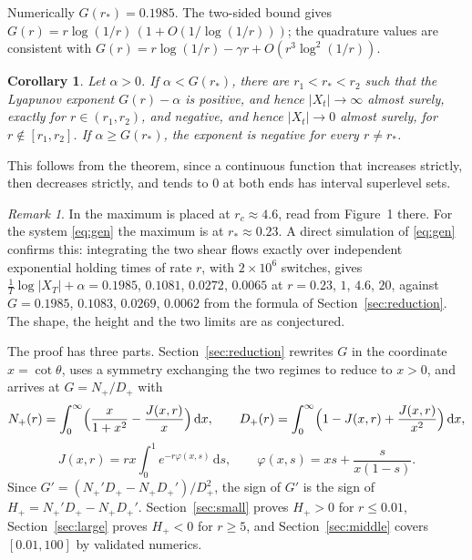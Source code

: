 \documentclass[11pt]{amsart}
\newtheorem{corollary}[theorem]{Corollary}
\theoremstyle{remark}
\newtheorem{remark}[theorem]{Remark}
\numberwithin{equation}{section}
\newcommand{\dd}{\,\mathrm{d}}
\begin{document}
Numerically $G(r_*)=0.1985$. The two-sided bound gives $G(r)=r\log(1/r)\,(1+O(1/\log(1/r)))$; the quadrature values are consistent with $G(r)=r\log(1/r)-\gamma r+O(r^3\log^2(1/r))$.

\begin{corollary}\label{cor:interval}
Let $\alpha>0$. If $\alpha<G(r_*)$, there are $r_1<r_*<r_2$ such that the Lyapunov exponent $G(r)-\alpha$ is positive, and hence $|X_t|\to\infty$ almost surely, exactly for $r\in(r_1,r_2)$, and negative, and hence $|X_t|\to0$ almost surely, for $r\notin[r_1,r_2]$. If $\alpha\ge G(r_*)$, the exponent is negative for every $r\ne r_*$.
\end{corollary}

This follows from the theorem, since a continuous function that increases strictly, then decreases strictly, and tends to $0$ at both ends has interval superlevel sets.

\begin{remark}\label{rem:scale}
In \cite{Ma} the maximum is placed at $r_c\approx4.6$, read from Figure~1 there. For the system \eqref{eq:gen} the maximum is at $r_*\approx0.23$. A direct simulation of \eqref{eq:gen} confirms this: integrating the two shear flows exactly over independent exponential holding times of rate $r$, with $2\times10^6$ switches, gives $\frac1T\log|X_T|+\alpha=0.1985$, $0.1081$, $0.0272$, $0.0065$ at $r=0.23$, $1$, $4.6$, $20$, against $G=0.1985$, $0.1083$, $0.0269$, $0.0062$ from the formula of Section~\ref{sec:reduction}. The shape, the height and the two limits are as conjectured.
\end{remark}

The proof has three parts. Section~\ref{sec:reduction} rewrites $G$ in the coordinate $x=\cot\theta$, uses a symmetry exchanging the two regimes to reduce to $x>0$, and arrives at $G=N_+/D_+$ with
\begin{equation}\label{eq:ND}
N_+(r)=\int_0^\infty\Bigl(\frac{x}{1+x^2}-\frac{J(x,r)}x\Bigr)\dd x,\qquad D_+(r)=\int_0^\infty\Bigl(1-J(x,r)+\frac{J(x,r)}{x^2}\Bigr)\dd x,
\end{equation}
\begin{equation}\label{eq:J}
J(x,r)=rx\int_0^1e^{-r\varphi(x,s)}\dd s,\qquad \varphi(x,s)=xs+\frac{s}{x(1-s)}.
\end{equation}
Since $G'=(N_+'D_+-N_+D_+')/D_+^2$, the sign of $G'$ is the sign of $H_+=N_+'D_+-N_+D_+'$. Section~\ref{sec:small} proves $H_+>0$ for $r\le0.01$, Section~\ref{sec:large} proves $H_+<0$ for $r\ge5$, and Section~\ref{sec:middle} covers $[0.01,100]$ by validated numerics.
\end{document}
